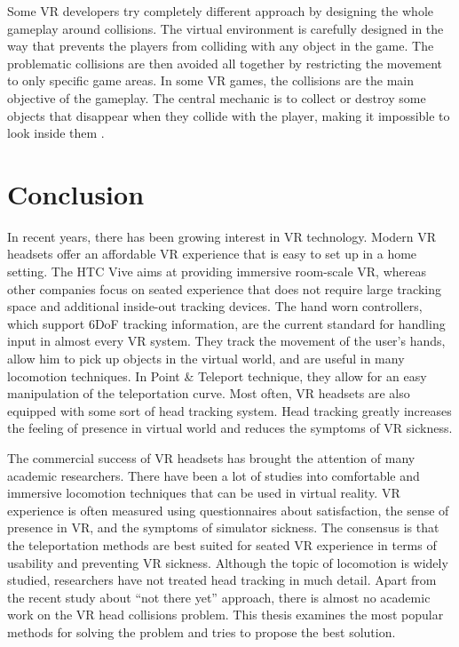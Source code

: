 Some VR developers try completely different approach by designing the whole gameplay around collisions. The virtual environment is carefully designed in the way that prevents the players from colliding with any object in the game. The problematic collisions are then avoided all together by restricting the movement to only specific game areas. In some VR games, the collisions are the main objective of the gameplay. The central mechanic is to collect or destroy some objects that disappear when they collide with the player, making it impossible to look inside them \cite{ELEVR}. 

\section{Conclusion}

In recent years, there has been growing interest in VR technology. Modern VR headsets offer an affordable VR experience that is easy to set up in a home setting. The HTC Vive aims at providing immersive room-scale VR, whereas other companies focus on seated experience that does not require large tracking space and additional inside-out tracking devices. The hand worn controllers, which support 6DoF tracking information, are the current standard for handling input in almost every VR system. They track the movement of the user's hands, allow him to pick up objects in the virtual world, and are useful in many locomotion techniques. In Point \& Teleport technique, they allow for an easy manipulation of the teleportation curve. Most often, VR headsets are also equipped with some sort of head tracking system. Head tracking greatly increases the feeling of presence in virtual world and reduces the symptoms of VR sickness.

The commercial success of VR headsets has brought the attention of many academic researchers. There have been a lot of studies into comfortable and immersive locomotion techniques that can be used in virtual reality. VR experience is often measured using questionnaires about satisfaction, the sense of presence in VR, and the symptoms of simulator sickness. The consensus is that the teleportation methods are best suited for seated VR experience in terms of usability and preventing VR sickness. Although the topic of locomotion is widely studied, researchers have not treated head tracking in much detail. Apart from the recent study about ``not there yet'' approach, there is almost no academic work on the VR head collisions problem. This thesis examines the most popular methods for solving the problem and tries to propose the best solution.